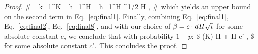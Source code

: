 \begin{proof}
  \#\label{eq:final8}
  \sum_{k=1}^{K} \sum_{h=1}^H     \leq \sum_{h=1}^H   \cdot \biggl [ \sum_{k=1}^K (\bphi^{k}_h)\trans (\Lambda^k_h)^{-1}  \bphi^{k}_h \biggl] ^{1/2 } \leq  H \cdot {} , 
  \#
  which yields an upper bound on the second term in Eq.~\eqref{eq:final1}. Finally, combining Eq.~\eqref{eq:final1}, Eq.~\eqref{eq:final2}, Eq.~\eqref{eq:final8}, and with our choice of $\beta = c \cdot dH\sqrt{\iota}$ for some absolute constant c, we conclude that with probability $1-p$:
  \$
  (K)   H  +  \beta H  \le c' \cdot {},
  \$
  for some absolute constant $c'$. This concludes the proof.
  \end{proof}




